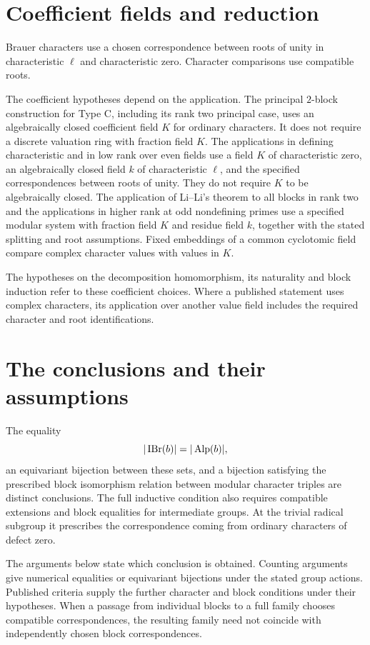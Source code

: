\section{Coefficient fields and reduction}

Brauer characters use a chosen correspondence between roots of unity in
characteristic $\ell$ and characteristic zero. Character comparisons use
compatible roots.

The coefficient hypotheses depend on the application. The principal
$2$-block construction for Type C, including its rank two principal
case, uses an algebraically closed coefficient field $K$ for ordinary characters. It does not
require a discrete valuation ring with fraction field $K$. The applications
in defining characteristic and in low rank over even fields use a field
$K$ of characteristic zero, an algebraically closed field $k$ of
characteristic $\ell$, and the specified correspondences between roots
of unity. They do not require $K$ to be algebraically closed.
The application of Li--Li's theorem to all blocks in rank two and the applications
in higher rank at odd nondefining primes use a specified modular system
with fraction field $K$ and residue field $k$, together with the stated
splitting and root assumptions. Fixed embeddings of a common cyclotomic
field compare complex character values with values in $K$.

The hypotheses on the decomposition homomorphism, its naturality and
block induction refer to these coefficient choices. Where a published
statement uses complex characters, its application over another value
field includes the required character and root identifications.

\section{The conclusions and their assumptions}

The equality
\[
 |\operatorname{IBr}(b)|=|\operatorname{Alp}(b)|,
\]
an equivariant bijection between these sets, and a bijection satisfying
the prescribed block isomorphism relation between modular character
triples are distinct conclusions. The full inductive condition also requires compatible
extensions and block equalities for intermediate groups. At the trivial
radical subgroup it prescribes the correspondence coming from ordinary
characters of defect zero.

The arguments below state which conclusion is obtained. Counting
arguments give numerical equalities or equivariant bijections under the
stated group actions. Published criteria supply the further character
and block conditions under their hypotheses. When a passage from
individual blocks to a full family chooses compatible correspondences,
the resulting family need not coincide with independently chosen block
correspondences.

